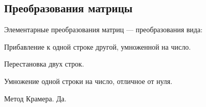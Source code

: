 \subsection{Преобразования матрицы}

{\bold Элементарные преобразования матриц} --- преобразования вида:
\begin{list*}[][\#]
\item Прибавление к одной строке другой, умноженной на число.
\item Перестановка двух строк.
\item Умножение одной строки на число, отличное от нуля. 
\end{list*}

\begin{theorem}
{\bold Метод Крамера.} Да.
\end{theorem}
